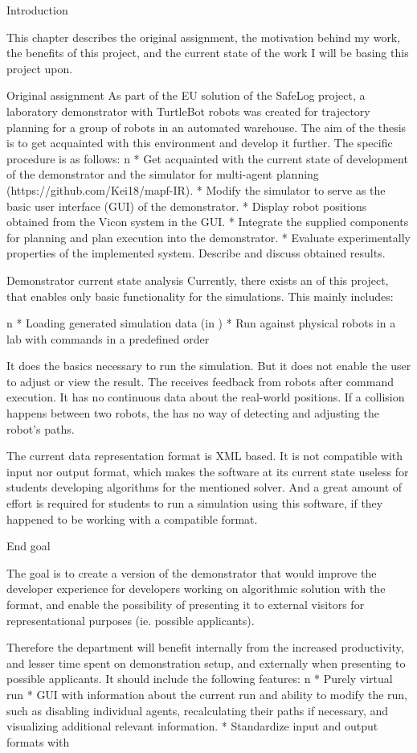 \chap Introduction

This chapter describes the original assignment, the motivation behind my work, the benefits of this project, and the current state of the work I will be basing this project upon.

\sec Original assignment
As part of the EU solution of the SafeLog project, a laboratory demonstrator with TurtleBot robots was created for trajectory planning for a group of robots in an automated warehouse. The aim of the thesis is to get acquainted with this environment and develop it further. The specific procedure is as follows:
\begitems \style n
    * Get acquainted with the current state of development of the demonstrator and the simulator for multi-agent planning (https://github.com/Kei18/mapf-IR).
    * Modify the simulator to serve as the basic user interface (GUI) of the demonstrator.
    * Display robot positions obtained from the Vicon system in the GUI.
    * Integrate the supplied components for planning and plan execution into the demonstrator.
    * Evaluate experimentally properties of the implemented system. Describe and discuss obtained results.
\enditems

\sec Demonstrator current state analysis
Currently, there exists an {\oldRepo} of this project, that enables only basic functionality for the simulations. This mainly includes:

\begitems \style n
    * Loading generated simulation data (in {\oldFormat})
    * Run against physical robots in a lab with commands in a predefined order
\enditems

It does the basics necessary to run the simulation. But it does not enable the user to adjust or view the result. The {\oldRepo} receives feedback from robots after command execution. It has no continuous data about the real-world positions. If a collision happens between two robots, the {\oldRepo} has no way of detecting and adjusting the robot's paths.

The current data representation format is XML based. It is not compatible with {\mapfIR} input nor output format, which makes the software at its current state useless for students developing algorithms for the \mapfIR mentioned solver. And a great amount of effort is required for students to run a simulation using this software, if they happened to be working with a compatible format.

\sec End goal

The goal is to create a version of the demonstrator that would improve the developer experience for developers working on algorithmic solution with the {\mapfIR} format, and enable the possibility of presenting it to external visitors for representational purposes (ie. possible applicants).

Therefore the department will benefit internally from the increased productivity, and lesser time spent on demonstration setup, and externally when presenting to possible applicants.
It should include the following features:
\begitems \style n
    * Purely virtual run
    * GUI with information about the current run and ability to modify the run, such as disabling individual agents, recalculating their paths if necessary, and visualizing additional relevant information.
    * Standardize input and output formats with \mapfIR
\enditems